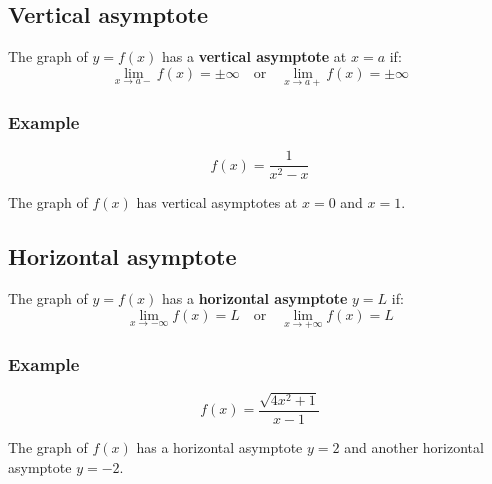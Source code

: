 \documentclass[11pt]{article}
\begin{document}
\newpage
\subsection{Vertical asymptote}
\label{sec:org1e111b0}
The graph of \(y = f(x)\) has a \textbf{vertical asymptote} at \(x = a\) if:
\[\lim_{x \rightarrow a-} f(x) = \pm \infty \quad \text{or} \quad \lim_{x \rightarrow a+} f(x) = \pm \infty\]
\subsubsection{Example}
\label{sec:org4c70d46}
\[f(x) = \frac{1}{x^2 - x}\]

The graph of \(f(x)\) has vertical asymptotes at \(x = 0\) and \(x = 1\).

\begin{center}
\end{center}

\newpage
\subsection{Horizontal asymptote}
\label{sec:orga22f656}
The graph of \(y = f(x)\) has a \textbf{horizontal asymptote} \(y = L\) if:
\[\lim_{x \rightarrow -\infty} f(x) = L \quad \text{or} \quad \lim_{x \rightarrow +\infty} f(x) = L\]
\subsubsection{Example}
\label{sec:org0814ca0}
\[f(x) = \frac{\sqrt{4x^2 + 1}}{x - 1}\]

The graph of \(f(x)\) has a horizontal asymptote \(y = 2\) and another horizontal asymptote \(y = -2\).

\begin{center}
\end{center}
\end{document}
